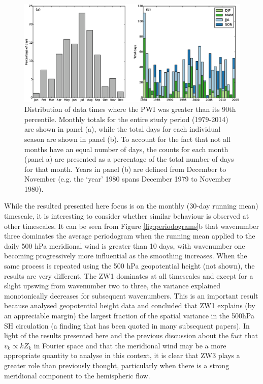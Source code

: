 \begin{figure}
\begin{center}
\includegraphics[width=1\columnwidth]{figures/zonalwaves/dates-summary_pwigt90pct_ERAInterim_500hPa_030day-runmean_native.eps}
\caption[Distribution of data times where the PWI was greater than its 90th percentile]{\label{fig:annual_distribution}
Distribution of data times where the PWI was greater than its 90th percentile. Monthly totals for the entire study period (1979-2014) are shown in panel (a), while the total days for each individual season are shown in panel (b). To account for the fact that not all months have an equal number of days, the counts for each month (panel a) are presented as a percentage of the total number of days for that month. Years in panel (b) are defined from December to November (e.g. the `year' 1980 spans December 1979 to November 1980).}
\end{center}
\end{figure}

While the resulted presented here focus is on the monthly (30-day running mean) timescale, it is interesting to consider whether similar behaviour is observed at other timescales. It can be seen from Figure \ref{fig:periodograms}b that wavenumber three dominates the average periodogram when the running mean applied to the daily 500 hPa meridional wind is greater than 10 days, with wavenumber one becoming progressively more influential as the smoothing increases. When the same process is repeated using the 500 hPa geopotential height (not shown), the results are very different. The ZW1 dominates at all timescales and except for a slight upswing from wavenumber two to three, the variance explained monotonically decreases for subsequent wavenumbers. This is an important result because \citet{vanLoon1972} analysed geopotential height data and concluded that ZW1 explains (by an appreciable margin) the largest fraction of the spatial variance in the 500hPa SH circulation (a finding that has been quoted in many subsequent papers). In light of the results presented here and the previous discussion about the fact that $v_k \propto k Z_k$ in Fourier space and that the meridional wind may be a more appropriate quantity to analyse in this context, it is clear that ZW3 plays a greater role than previously thought, particularly when there is a strong meridional component to the hemispheric flow. 

